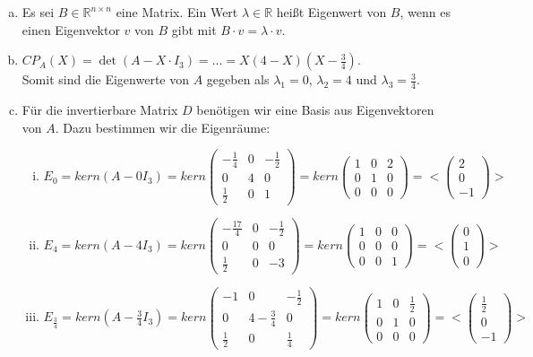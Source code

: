 \documentclass[a4paper,11pt]{scrartcl}
\newcommand{\RR}{\mathbb{R}}
\begin{document}
\begin{enumerate}[a)]
\item Es sei $B\in\RR^{n\times n}$ eine Matrix. Ein Wert $\lambda \in \RR$ heißt Eigenwert von $B$, wenn es einen Eigenvektor $v$ von $B$ gibt mit $B\cdot v = \lambda\cdot v$.
\item $CP_A(X)=\det(A-X\cdot I_3)=...=X(4-X)(X-\frac{3}{4})$. \\
Somit sind die Eigenwerte von $A$ gegeben als $\lambda_1=0$, $\lambda_2=4$ und $\lambda_3=\frac{3}{4}$.
\item Für die invertierbare Matrix $D$ benötigen wir eine Basis aus Eigenvektoren von $A$. Dazu bestimmen wir die Eigenräume:
\begin{enumerate}[i)]
\item $E_0=kern(A-0I_3)=kern\begin{pmatrix} -\frac{1}{4} & 0 & -\frac{1}{2} \\ 0 & 4 & 0 \\ \frac{1}{2} & 0 &1 \end{pmatrix}=kern\begin{pmatrix} 1 & 0 & 2 \\ 0 & 1 & 0 \\ 0 & 0 &0 \end{pmatrix}=<\begin{pmatrix} 2\\0\\-1 \end{pmatrix}>$
\item $E_4=kern(A-4I_3)=kern\begin{pmatrix} -\frac{17}{4} & 0 & -\frac{1}{2} \\ 0 & 0 & 0 \\ \frac{1}{2} & 0 &-3 \end{pmatrix}=kern\begin{pmatrix} 1 & 0 & 0 \\ 0 & 0 & 0 \\ 0 & 0 &1 \end{pmatrix}=<\begin{pmatrix} 0\\1\\0 \end{pmatrix}>$
\item $E_\frac{3}{4}=kern(A-\frac{3}{4}I_3)=kern\begin{pmatrix} -1 & 0 & -\frac{1}{2} \\ 0 & 4-\frac{3}{4} & 0 \\ \frac{1}{2} & 0 &\frac{1}{4} \end{pmatrix}=kern\begin{pmatrix} 1 & 0 & \frac{1}{2} \\ 0 & 1 & 0 \\ 0 & 0 &0 \end{pmatrix}=<\begin{pmatrix} \frac{1}{2}\\0\\-1 \end{pmatrix}>$

\end{enumerate}
\end{enumerate}
\end{document}
